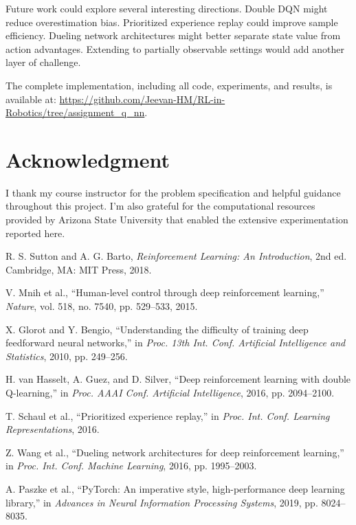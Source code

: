 \documentclass[conference]{IEEEtran}
\begin{document}
Future work could explore several interesting directions. Double DQN \cite{van2016deep} might reduce overestimation bias. Prioritized experience replay \cite{schaul2015prioritized} could improve sample efficiency. Dueling network architectures \cite{wang2016dueling} might better separate state value from action advantages. Extending to partially observable settings would add another layer of challenge.

The complete implementation, including all code, experiments, and results, is available at: \url{https://github.com/Jeevan-HM/RL-in-Robotics/tree/assignment_q_nn}.

\section*{Acknowledgment}

I thank my course instructor for the problem specification and helpful guidance throughout this project. I'm also grateful for the computational resources provided by Arizona State University that enabled the extensive experimentation reported here.

\begin{thebibliography}{00}
 R. S. Sutton and A. G. Barto, \textit{Reinforcement Learning: An Introduction}, 2nd ed. Cambridge, MA: MIT Press, 2018.

 V. Mnih et al., ``Human-level control through deep reinforcement learning,'' \textit{Nature}, vol. 518, no. 7540, pp. 529--533, 2015.

 X. Glorot and Y. Bengio, ``Understanding the difficulty of training deep feedforward neural networks,'' in \textit{Proc. 13th Int. Conf. Artificial Intelligence and Statistics}, 2010, pp. 249--256.

 H. van Hasselt, A. Guez, and D. Silver, ``Deep reinforcement learning with double Q-learning,'' in \textit{Proc. AAAI Conf. Artificial Intelligence}, 2016, pp. 2094--2100.

 T. Schaul et al., ``Prioritized experience replay,'' in \textit{Proc. Int. Conf. Learning Representations}, 2016.

 Z. Wang et al., ``Dueling network architectures for deep reinforcement learning,'' in \textit{Proc. Int. Conf. Machine Learning}, 2016, pp. 1995--2003.

 A. Paszke et al., ``PyTorch: An imperative style, high-performance deep learning library,'' in \textit{Advances in Neural Information Processing Systems}, 2019, pp. 8024--8035.

\end{thebibliography}
\end{document}
